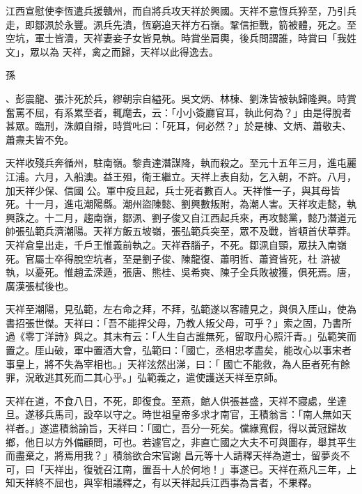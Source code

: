 \begin{pinyinscope}
 江西宣慰使李恆遣兵援贛州，而自將兵攻天祥於興國。天祥不意恆兵猝至，乃引兵走，即鄒洬於永豐。洬兵先潰，恆窮追天祥方石嶺。鞏信拒戰，箭被體，死之。至空坑，軍士皆潰，天祥妻妾子女皆見執。時賞坐肩輿，後兵問謂誰，時賞曰「我姓文」，眾以為
 天祥，禽之而歸，天祥以此得逸去。



 孫
 
  
   
  
 
 、彭震龍、張汴死於兵，繆朝宗自縊死。吳文炳、林棟、劉洙皆被執歸隆興。時賞奮罵不屈，有系累至者，輒麾去，云：「小小簽廳官耳，執此何為？」由是得脫者甚眾。臨刑，洙頗自辯，時賞𠮟曰：「死耳，何必然？」於是棟、文炳、蕭敬夫、蕭燾夫皆不免。



 天祥收殘兵奔循州，駐南嶺。黎貴達潛謀降，執而殺之。至元十五年三月，進屯麗江浦。六月，入船澳。益王殂，衛王繼立。天祥上表自劾，乞入朝，不許。八月，加天祥少保、信國
 公。軍中疫且起，兵士死者數百人。天祥惟一子，與其母皆死。十一月，進屯潮陽縣。潮州盜陳懿、劉興數叛附，為潮人害。天祥攻走懿，執興誅之。十二月，趨南嶺，鄒洬、劉子俊又自江西起兵來，再攻懿黨，懿乃潛道元帥張弘範兵濟潮陽。天祥方飯五坡嶺，張弘範兵突至，眾不及戰，皆頓首伏草莽。天祥倉皇出走，千戶王惟義前執之。天祥吞腦子，不死。鄒洬自頸，眾扶入南嶺死。官屬士卒得脫空坑者，至是劉子俊、陳龍復、蕭明哲、蕭資皆死，杜
 滸被執，以憂死。惟趙孟溁遁，張唐、熊桂、吳希奭、陳子全兵敗被獲，俱死焉。唐，廣漢張栻後也。



 天祥至潮陽，見弘範，左右命之拜，不拜，弘範遂以客禮見之，與俱入厓山，使為書招張世傑。天祥曰：「吾不能捍父母，乃教人叛父母，可乎？」索之固，乃書所過《零丁洋詩》與之。其末有云：「人生自古誰無死，留取丹心照汗青。」弘範笑而置之。厓山破，軍中置酒大會，弘範曰：「國亡，丞相忠孝盡矣，能改心以事宋者事皇上，將不失為宰相也。」天祥泫然出涕，曰：「
 國亡不能救，為人臣者死有餘罪，況敢逃其死而二其心乎。」弘範義之，遣使護送天祥至京師。



 天祥在道，不食八日，不死，即復食。至燕，館人供張甚盛，天祥不寢處，坐達旦。遂移兵馬司，設卒以守之。時世祖皇帝多求才南官，王積翁言：「南人無如天祥者。」遂遣積翁諭旨，天祥曰：「國亡，吾分一死矣。儻緣寬假，得以黃冠歸故鄉，他日以方外備顧問，可也。若遽官之，非直亡國之大夫不可與圖存，舉其平生而盡棄之，將焉用我？」積翁欲合宋官謝
 昌元等十人請釋天祥為道士，留夢炎不可，曰「天祥出，復號召江南，置吾十人於何地！」事遂已。天祥在燕凡三年，上知天祥終不屈也，與宰相議釋之，有以天祥起兵江西事為言者，不果釋。




\end{pinyinscope}
